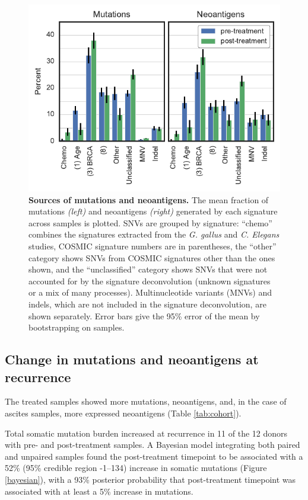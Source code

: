 \begin{figure}[htbp]
\centering
\includegraphics[scale=1.0]{figures/sources_of_mutations_and_neoantigens.pdf}
\caption{\textbf{Sources of mutations and neoantigens.}  The mean fraction of mutations \textit{(left)} and neoantigens \textit{(right)} generated by each signature across samples is plotted. SNVs are grouped by signature: ``chemo'' combines the signatures extracted from the \textit{G. gallus} and \textit{C. Elegans} studies, COSMIC signature numbers are in parentheses, the ``other'' category shows SNVs from COSMIC signatures other than the ones shown, and the ``unclassified'' category shows SNVs that were not accounted for by the signature deconvolution (unknown signatures or a mix of many processes). Multinucleotide variants (MNVs) and indels, which are not included in the signature deconvolution, are shown separately. Error bars give the 95\% error of the mean by bootstrapping on samples.}
\label{fig:sources}
\end{figure}

\subsection*{Change in mutations and neoantigens at recurrence}
The treated samples showed more mutations, neoantigens, and, in the case of ascites samples, more expressed neoantigens (Table \ref{tab:cohort}).

Total somatic mutation burden increased at recurrence in 11 of the 12 donors with pre- and post-treatment samples. A Bayesian model integrating both paired and unpaired samples found the post-treatment timepoint to be associated with a 52\% (95\% credible region -1--134) increase in somatic mutations (Figure \ref{bayesian}), with a 93\% posterior probability that post-treatment timepoint was associated with at least a 5\% increase in mutations. 

